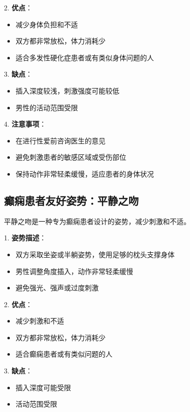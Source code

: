 \documentclass[12pt,UTF8]{ctexbook}
\begin{document}
2. \textbf{优点}：
  \begin{itemize}
  \item 减少身体负担和不适
  \item 双方都非常放松，体力消耗少
  \item 适合多发性硬化症患者或有类似身体问题的人
  \end{itemize}

3. \textbf{缺点}：
  \begin{itemize}
  \item 插入深度较浅，刺激强度可能较低
  \item 男性的活动范围受限
  \end{itemize}

4. \textbf{注意事项}：
  \begin{itemize}
  \item 在进行性爱前咨询医生的意见
  \item 避免刺激患者的敏感区域或受伤部位
  \item 保持动作非常轻柔缓慢，适应患者的身体状况
  \end{itemize}

\subsection{癫痫患者友好姿势：平静之吻}

平静之吻是一种专为癫痫患者设计的姿势，减少刺激和不适。

1. \textbf{姿势描述}：
  \begin{itemize}
  \item 双方采取坐姿或半躺姿势，使用足够的枕头支撑身体
  \item 男性调整角度插入，动作非常轻柔缓慢
  \item 避免强光、强声或过度刺激
  \end{itemize}

2. \textbf{优点}：
  \begin{itemize}
  \item 减少刺激和不适
  \item 双方都非常放松，体力消耗少
  \item 适合癫痫患者或有类似问题的人
  \end{itemize}

3. \textbf{缺点}：
  \begin{itemize}
  \item 插入深度可能受限
  \item 活动范围受限
  \end{itemize}
\end{document}
